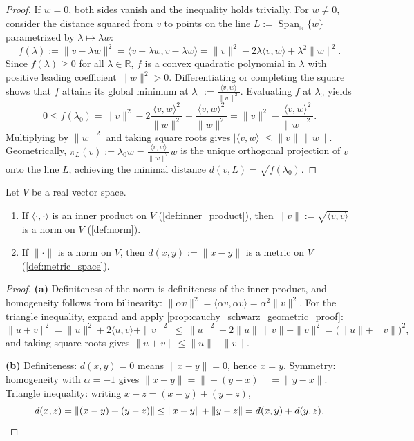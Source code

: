 \begin{proof}
If $w = 0$, both sides vanish and the inequality holds trivially. For $w \neq 0$, consider the distance squared from $v$ to points on the line $L := \operatorname{Span}_{\mathbb{R}}\{w\}$ parametrized by $\lambda \mapsto \lambda w$:
\[
f(\lambda) := \|v - \lambda w\|^2 = \langle v - \lambda w, v - \lambda w\rangle = \|v\|^2 - 2\lambda\langle v, w\rangle + \lambda^2\|w\|^2.
\]
Since $f(\lambda) \geq 0$ for all $\lambda \in \mathbb{R}$, $f$ is a convex quadratic polynomial in $\lambda$ with positive leading coefficient $\|w\|^2 > 0$. Differentiating or completing the square shows that $f$ attains its global minimum at $\lambda_0 := \frac{\langle v, w\rangle}{\|w\|^2}$. Evaluating $f$ at $\lambda_0$ yields
\[
0 \leq f(\lambda_0) = \|v\|^2 - 2\frac{\langle v, w\rangle^2}{\|w\|^2} + \frac{\langle v, w\rangle^2}{\|w\|^2} = \|v\|^2 - \frac{\langle v, w\rangle^2}{\|w\|^2}.
\]
Multiplying by $\|w\|^2$ and taking square roots gives $|\langle v, w\rangle| \leq \|v\|\,\|w\|$. Geometrically, $\pi_L(v) := \lambda_0 w = \frac{\langle v, w\rangle}{\|w\|^2}w$ is the unique orthogonal projection of $v$ onto the line $L$, achieving the minimal distance $d(v, L) = \sqrt{f(\lambda_0)}$.
\end{proof}

\begin{proposition}
\label{prop:induced_norm_and_metric}
Let $V$ be a real vector space.
\begin{enumerate}[label=\textbf{(\alph*)}]
  \item If $\langle\cdot,\cdot\rangle$ is an inner product on $V$ (\cref{def:inner_product}),
    then $\|v\| := \sqrt{\langle v,v\rangle}$ is a norm on $V$ (\cref{def:norm}).
  \item If $\|\cdot\|$ is a norm on $V$, then $d(x,y) := \|x-y\|$ is a metric on $V$
    (\cref{def:metric_space}).
\end{enumerate}
\end{proposition}

\begin{proof}
\textbf{(a)} Definiteness of the norm is definiteness of the inner product, and homogeneity
follows from bilinearity: $\|\alpha v\|^2 = \langle\alpha v,\alpha v\rangle =
\alpha^2\|v\|^2$. For the triangle inequality, expand and apply
\cref{prop:cauchy_schwarz_geometric_proof}:
\[\|u+v\|^2 = \|u\|^2 + 2\langle u,v\rangle + \|v\|^2
  \ \leq\ \|u\|^2 + 2\|u\|\,\|v\| + \|v\|^2 = \big(\|u\|+\|v\|\big)^2,\]
and taking square roots gives $\|u+v\| \leq \|u\|+\|v\|$.

\textbf{(b)} Definiteness: $d(x,y)=0$ means $\|x-y\|=0$, hence $x=y$. Symmetry: homogeneity
with $\alpha=-1$ gives $\|x-y\| = \|-(y-x)\| = \|y-x\|$. Triangle inequality: writing
$x-z = (x-y)+(y-z)$,
\[d(x,z) = \|(x-y)+(y-z)\| \leq \|x-y\| + \|y-z\| = d(x,y)+d(y,z). \qedhere\]
\end{proof}

